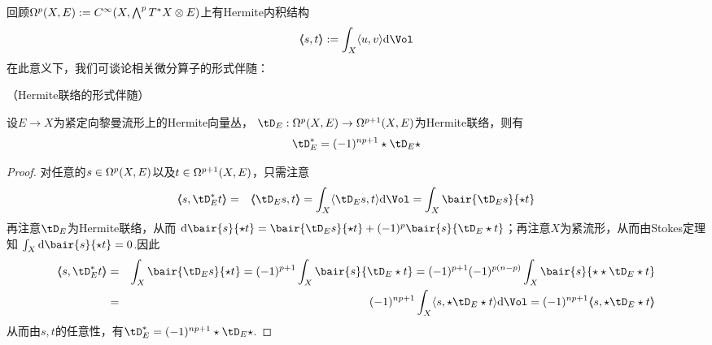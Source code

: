 回顾$\Omega^p(X,E):=C^\infty(X,\bigwedge\nolimits^{p}T^*X\otimes E)$上有Hermite内积结构
$$\ppair{s}{t}:=\int_X\pair{u}{v}\td\Vol$$
在此意义下，我们可谈论相关微分算子的形式伴随：


\begin{prop}（Hermite联络的形式伴随）

设$E\to X$为紧定向黎曼流形上的Hermite向量丛，
$\tD_E:\Omg^p(X,E)\to\Omg^{p+1}(X,E)$为Hermite联络，则有
$$\tD_E^*=(-1)^{np+1}\star\tD_E\star$$
\end{prop}

\begin{proof}
对任意的$s\in\Omega^p(X,E)$以及$t\in\Omega^{p+1}(X,E)$，只需注意
\begin{eqnarray*}
     \ppair{s}{\tD_E^*t}
&=&
     \ppair{\tD_Es}{t}
 =
     \int_X\pair{\tD_Es}{t}\td\Vol
 =
     \int_X
       \bair{\tD_Es}{\star t}
\end{eqnarray*}
再注意$\tD_E$为Hermite联络，从而
$
  \td\bair{s}{\star t}
= \bair{\tD_Es}{\star t}+(-1)^p\bair{s}{\tD_E\star t}
$；再注意$X$为紧流形，从而由Stokes定理知
$\int_X\td\bair{s}{\star t}=0$.因此
\begin{eqnarray*}
  \ppair{s}{\tD_E^*t}
&=&
  \int_X\bair{\tD_Es}{\star t}
=
  (-1)^{p+1}\int_X
    \bair{s}{\tD_E\star t}
=
  (-1)^{p+1}(-1)^{p(n-p)}\int_X
    \bair{s}{\star\star\tD_E\star t}\\
&=&
  (-1)^{np+1}\int_X
    \pair{s}{\star\tD_E\star t}\td\Vol
=
  (-1)^{np+1}\ppair{s}{\star\tD_E\star t}
\end{eqnarray*}
从而由$s,t$的任意性，有$\tD_E^*=(-1)^{np+1}\star\tD_E\star$.
\end{proof}

